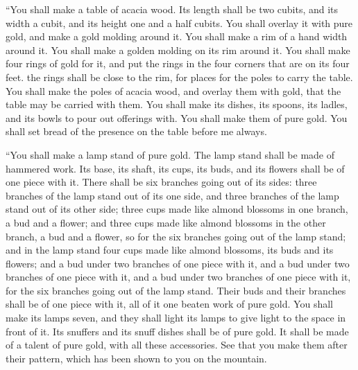 {\par }{\PP {}“You shall make a table of acacia wood. Its length shall be two cubits, and its width a cubit, and its height one and a half cubits.
You shall overlay it with pure gold, and make a gold molding around it.
You shall make a rim of a hand width around it. You shall make a golden molding on its rim around it.
You shall make four rings of gold for it, and put the rings in the four corners that are on its four feet.
the rings shall be close to the rim, for places for the poles to carry the table.
You shall make the poles of acacia wood, and overlay them with gold, that the table may be carried with them.
You shall make its dishes, its spoons, its ladles, and its bowls to pour out offerings with. You shall make them of pure gold.
You shall set bread of the presence on the table before me always.
\par }{\PP {}“You shall make a lamp stand of pure gold. The lamp stand shall be made of hammered work. Its base, its shaft, its cups, its buds, and its flowers shall be of one piece with it.
There shall be six branches going out of its sides: three branches of the lamp stand out of its one side, and three branches of the lamp stand out of its other side;
three cups made like almond blossoms in one branch, a bud and a flower; and three cups made like almond blossoms in the other branch, a bud and a flower, so for the six branches going out of the lamp stand;
and in the lamp stand four cups made like almond blossoms, its buds and its flowers;
and a bud under two branches of one piece with it, and a bud under two branches of one piece with it, and a bud under two branches of one piece with it, for the six branches going out of the lamp stand.
Their buds and their branches shall be of one piece with it, all of it one beaten work of pure gold.
You shall make its lamps seven, and they shall light its lamps to give light to the space in front of it.
Its snuffers and its snuff dishes shall be of pure gold.
It shall be made of a talent of pure gold, with all these accessories.
See that you make them after their pattern, which has been shown to you on the mountain.

}
